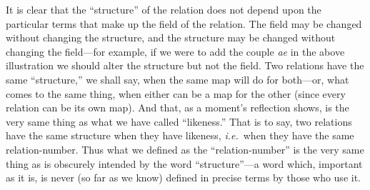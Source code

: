 {\ltronly{\figtwo}It is clear that the ``structure'' of the
relation does
not
depend upon
the particular terms that make up the field of the relation. The field
may be changed without changing the structure, and
the
structure may be changed without changing the field---for \protect{} example, if we
were to add the couple \textit{ae}
in the above illustration we should alter the
structure but not the field. Two relations have the same ``structure,''
we shall say, when the same map will do for both---or, what comes to the
same thing, when either can be a map for the other (since every
relation can be its own map). And that, as a moment's reflection shows,
is the very same thing as what we have called ``likeness.'' That is to
say, two relations have the same structure when they have likeness,
\textit{i.e.}\ when
they have the same relation-number. Thus what we defined as
the ``relation-number'' is the very same thing as is obscurely
intended
by the word ``structure''---a word which, important as it is, is never (so
far as we know) defined in precise terms by those who use it.\lxonly{\enlargethispage{\baselineskip}}

}
